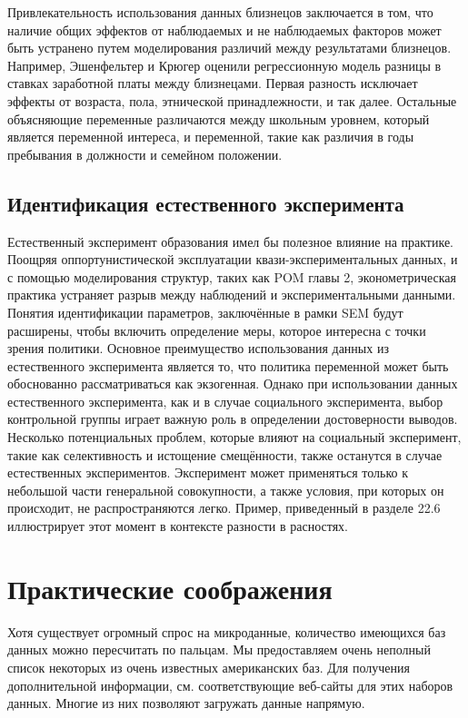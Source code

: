 Привлекательность использования данных близнецов заключается в том, что наличие общих эффектов от наблюдаемых и не наблюдаемых факторов может быть устранено путем моделирования различий между результатами близнецов. Например, Эшенфельтер и Крюгер оценили регрессионную модель разницы в ставках заработной платы между близнецами. Первая разность исключает эффекты от возраста, пола, этнической принадлежности, и так далее. Остальные объясняющие переменные различаются между школьным уровнем, который является переменной интереса, и переменной, такие как различия в годы пребывания в должности и семейном положении.


\subsection{Идентификация естественного эксперимента}

Естественный эксперимент образования имел бы полезное влияние на практике. Поощряя оппортунистической эксплуатации квази-экспериментальных данных, и с помощью моделирования структур, таких как POM главы 2, эконометрическая практика устраняет разрыв между наблюдений и экспериментальными данными. Понятия идентификации параметров, заключённые в рамки SEM будут расширены, чтобы включить определение меры, которое интересна с точки зрения политики. Основное преимущество использования данных из естественного эксперимента является то, что политика переменной может быть обоснованно рассматриваться как экзогенная. Однако при использовании данных естественного эксперимента, как и в случае социального эксперимента, выбор контрольной группы играет важную роль в определении достоверности выводов. Несколько потенциальных проблем, которые влияют на социальный эксперимент, такие как селективность и истощение смещённости, также останутся в случае естественных экспериментов. Эксперимент может применяться только к небольшой части генеральной совокупности, а также условия, при которых он происходит, не распространяются легко. Пример, приведенный в разделе 22.6 иллюстрирует этот момент в контексте разности в расностях.

\section{Практические соображения}


Хотя существует огромный спрос на микроданные, количество имеющихся баз данных можно пересчитать по пальцам. Мы предоставляем очень неполный список некоторых из очень известных американских баз. Для получения дополнительной информации, см. соответствующие веб-сайты для этих наборов данных. Многие из них позволяют загружать данные напрямую.


